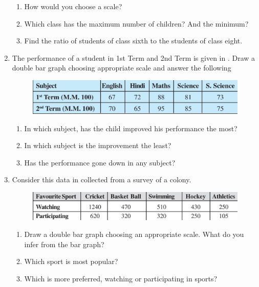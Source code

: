 \begin{enumerate}[label=\thesection.\arabic*, ref=\thesection.\theenumi,resume*]
\begin{figure}[H]
  \caption{}
  \label{fig:bar5}
\end{figure}
\begin{enumerate}
	\item How would you choose a scale? 
	\item  Which class has the maximum number of children? And the minimum? 
	\item  Find the ratio of students of class sixth to the students of class eight.
\end{enumerate}
\item The performance of a student in 1st Term and 2nd Term is given
in .
	Draw a double bar graph choosing appropriate scale and answer the following
	\begin{figure}[H]
  \centering
  \includegraphics[width=\columnwidth]{figs/bar6.jpg}
  \caption{}
  \label{fig:bar6}
\end{figure}
\begin{enumerate}
\item In which subject, has the child improved his performance the most? 
\item In which subject is the improvement the least? 
\item Has the performance gone down in any subject?
\end{enumerate}
\item Consider this data 
  in 
	collected from a survey of a colony.
	\begin{figure}[H]
  \centering
  \includegraphics[width=\columnwidth]{figs/bar7.jpg}
  \caption{}
  \label{fig:bar7}
\end{figure}
\begin{enumerate}
\item Draw a double bar graph choosing an appropriate scale. What do you infer from the bar graph?
\item Which sport is most popular? 
\item Which is more preferred, watching or participating in sports?
\end{enumerate}
\end{enumerate}
